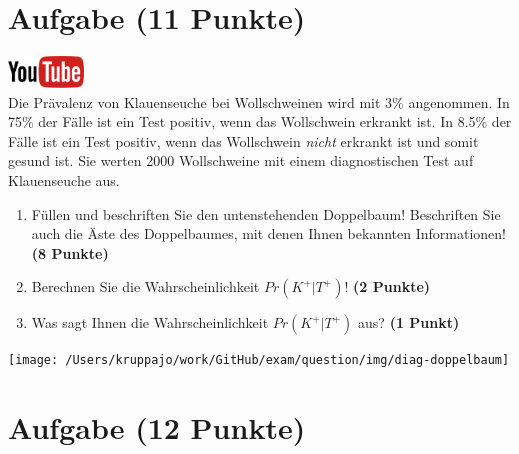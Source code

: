 \documentclass[a4paper, 9pt]{scrartcl}\usepackage[]{graphicx}\usepackage[]{xcolor}
\begin{document}
\clearpage

\section{Aufgabe \hfill (11 Punkte)}

\hfill\href{https://youtu.be/VQlNl8hvRII}{\includegraphics[width =
  2cm]{img/youtube}}\\[1Ex]


Die Pr{\"a}valenz von Klauenseuche bei Wollschweinen wird mit
3\% angenommen. In 75\% der F{\"a}lle ist ein Test positiv, wenn das Wollschwein erkrankt
ist. In 8.5\% der F{\"a}lle ist ein Test positiv,
wenn das Wollschwein \textit{nicht} erkrankt ist und somit gesund ist. Sie
werten 2000 Wollschweine mit einem
diagnostischen Test auf Klauenseuche aus.



\begin{enumerate}
\item F{\"u}llen und beschriften Sie den untenstehenden Doppelbaum! Beschriften
  Sie auch die {\"A}ste des Doppelbaumes, mit denen Ihnen bekannten
  Informationen!  \textbf{(8 Punkte)}
\item Berechnen Sie die Wahrscheinlichkeit $Pr(K^+|T^+)$! \textbf{(2 Punkte)}
\item Was sagt Ihnen die Wahrscheinlichkeit $Pr(K^+|T^+)$ aus? \textbf{(1 Punkt)}
\end{enumerate}

\vspace{1cm}

\begin{center}
  \texttt{[image: /Users/kruppajo/work/GitHub/exam/question/img/diag-doppelbaum]}
\end{center}



 
\clearpage

\section{Aufgabe \hfill (12 Punkte)}
\end{document}
